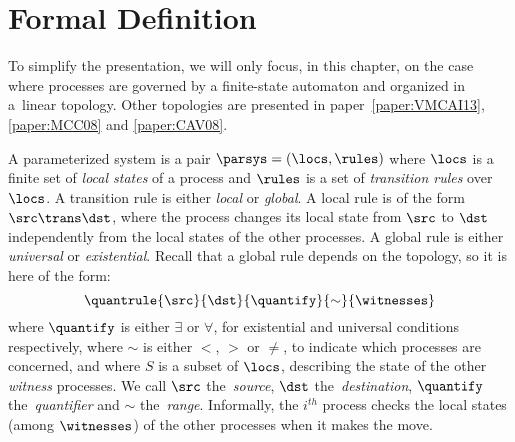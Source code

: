 
\section{Formal Definition}
\label{section:paramsys:definition}
%
% 
%
%
To simplify the presentation, we will only focus, in this chapter, on
the case where processes are governed by a finite-state automaton and
organized in a~linear topology.
% 
Other topologies are presented in paper~\ref{paper:VMCAI13},
\ref{paper:MCC08} and \ref{paper:CAV08}.

A parameterized system is a pair $\parsys=(\locs,\rules)$ where
$\locs$ is a finite set of \emph{local states} of a process and
$\rules$ is a set of \emph{transition rules} over $\locs$. %
A transition rule is either {\it local} or {\it global}.
% 
A local rule is of the form $\src\trans\dst$, where the process
changes its local state from $\src$ to $\dst$ independently from the
local states of the other processes.
% 
%
%
A global rule is either \emph{universal} or \emph{existential}.
%
Recall that a global rule depends on the topology, %
so it is here of the form:
$$\quantrule{\src}{\dst}{\quantify}{\sim}{\witnesses}$$
% 
where $\quantify$ is either $\exists$ or $\forall$, for existential
and universal conditions respectively, where $\sim$ is either $<$, $>$
or $\neq$, to indicate which processes are concerned, and %
where $S$ is a subset of $\locs$, describing the state of the other
\emph{witness} processes.
% 
%
%
%
%
We call $\src$ the~\emph{source}, $\dst$ the~\emph{destination},
$\quantify$ the~\emph{quantifier} and $\sim$ the~\emph{range}.
%
Informally, the $i^{th}$ process checks the local states (among
$\witnesses$) of the other processes when it makes the move.
%
